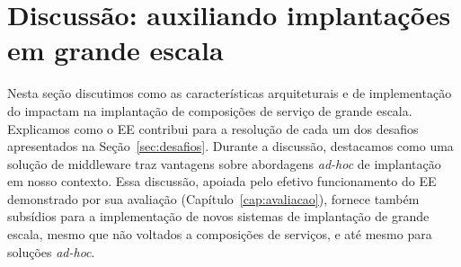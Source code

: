 \section{Discussão: auxiliando implantações em grande escala}
\label{sec:discussao}

Nesta seção discutimos como as características arquiteturais e de implementação do \ee
impactam na implantação de composições de serviço de grande escala.
Explicamos como o EE contribui para a resolução de cada um dos desafios
apresentados na Seção~\ref{sec:desafios}.
Durante a discussão, destacamos como uma solução de middleware traz vantagens
sobre abordagens \emph{ad-hoc} de implantação em nosso contexto.
Essa discussão, apoiada pelo efetivo funcionamento do EE demonstrado por sua avaliação
(Capítulo~\ref{cap:avaliacao}), fornece também subsídios para a implementação de novos sistemas
de implantação de grande escala, mesmo que não voltados a composições de serviços,
e até mesmo para soluções \emph{ad-hoc}.

